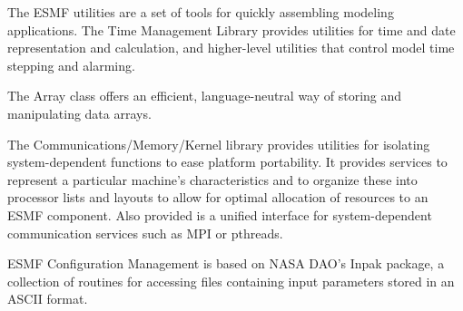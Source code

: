 
The ESMF utilities are
a set of tools for quickly assembling modeling applications.
The Time Management Library
provides utilities for time and date representation and calculation,
and higher-level utilities that control model time stepping and alarming.

The Array class offers an efficient, language-neutral way 
of storing and manipulating data arrays.

The Communications/Memory/Kernel library provides utilities for isolating system-dependent functions to ease
platform portability.  It provides services to represent a particular machine's
characteristics and to organize these into processor lists and layouts to
allow for optimal allocation of resources to an ESMF component. Also provided
is a unified interface for system-dependent communication services such as
MPI or pthreads. 

ESMF Configuration Management is based on NASA DAO's Inpak package, a collection of routines for accessing files containing
input parameters stored in an ASCII format.
